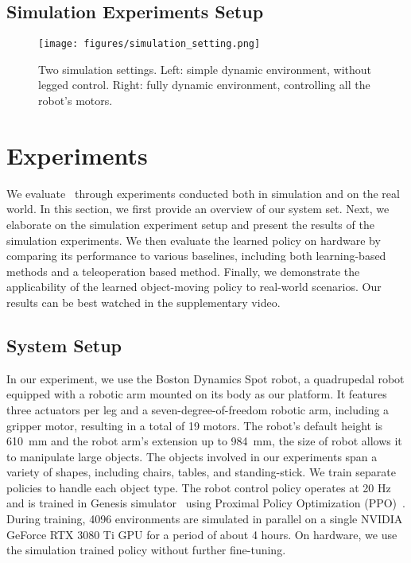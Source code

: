 
\subsection{Simulation Experiments Setup}
\label{sec:exp_sim_setup}

\begin{figure}[t]
 \centering
\texttt{[image: figures/simulation\_setting.png]}
\label{fig:simulation_setting}
 \vspace{-.5em}
\caption{Two simulation settings. Left: simple dynamic environment, without legged control. Right: fully dynamic environment, controlling all the robot's motors.}
 \vspace{-0.2cm}
\end{figure}



\section{Experiments}
 We evaluate \method~through experiments conducted both in simulation and on the real world. In this section, we first provide an overview of our system set. Next, we elaborate on the simulation experiment setup and present the results of the simulation experiments. We then evaluate the learned policy on hardware by comparing its performance to various baselines, including both learning-based methods and a teleoperation based method. Finally, we demonstrate the applicability of the learned object-moving policy to real-world scenarios. Our results can be best watched in the supplementary video.



\subsection{System Setup}

In our experiment, we use the Boston Dynamics Spot robot, a quadrupedal robot equipped with a robotic arm mounted on its body as our platform. It features three actuators per leg and a seven-degree-of-freedom robotic arm, including a gripper motor, resulting in a total of 19 motors. The robot's default height is 610~mm and the robot arm's extension up to 984~mm, the size of robot allows it to manipulate large objects. The objects involved in our experiments span a variety of shapes, including chairs, tables, and standing-stick. We train separate policies to handle each object type. The robot control policy operates at 20 Hz and is trained in Genesis simulator~\citep{Genesis} using Proximal Policy Optimization (PPO)~\citep{PPO}. During training, 4096 environments are simulated in parallel on a single NVIDIA GeForce RTX 3080 Ti GPU for a period of about 4 hours. On hardware, we use the simulation trained policy without further fine-tuning.


